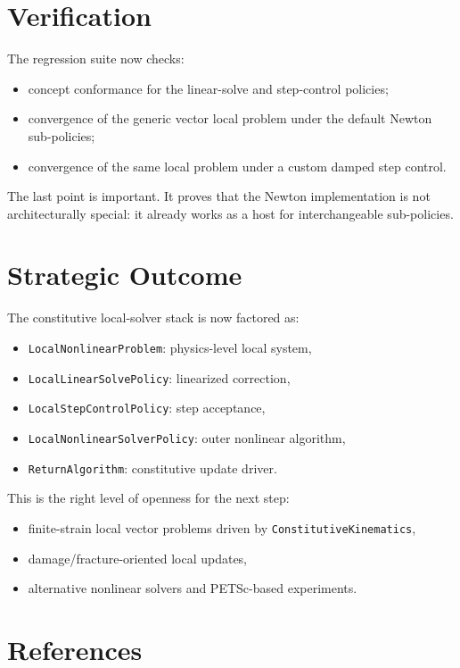 \section{Verification}

The regression suite now checks:
\begin{itemize}
  \item concept conformance for the linear-solve and step-control policies;
  \item convergence of the generic vector local problem under the default
        Newton sub-policies;
  \item convergence of the same local problem under a custom damped step
        control.
\end{itemize}

The last point is important.  It proves that the Newton implementation is not
architecturally special: it already works as a host for interchangeable
sub-policies.

\section{Strategic Outcome}

The constitutive local-solver stack is now factored as:
\begin{itemize}
  \item \texttt{LocalNonlinearProblem}: physics-level local system,
  \item \texttt{LocalLinearSolvePolicy}: linearized correction,
  \item \texttt{LocalStepControlPolicy}: step acceptance,
  \item \texttt{LocalNonlinearSolverPolicy}: outer nonlinear algorithm,
  \item \texttt{ReturnAlgorithm}: constitutive update driver.
\end{itemize}

This is the right level of openness for the next step:
\begin{itemize}
  \item finite-strain local vector problems driven by
        \texttt{ConstitutiveKinematics},
  \item damage/fracture-oriented local updates,
  \item alternative nonlinear solvers and PETSc-based experiments.
\end{itemize}

\section{References}

